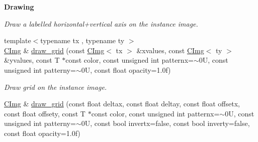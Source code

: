 \begin{Indent}{\bf Drawing}
\begin{DoxyCompactItemize}
\begin{DoxyCompactList}\small\item\em Draw a labelled horizontal+vertical axis on the instance image. \item\end{DoxyCompactList}\item 
\hypertarget{structcimg__library_1_1_c_img_a38f5283986f0cb4fdac660e489788634}{
{\footnotesize template$<$typename tx , typename ty $>$ }\\\hyperlink{structcimg__library_1_1_c_img}{CImg} \& \hyperlink{structcimg__library_1_1_c_img_a38f5283986f0cb4fdac660e489788634}{draw\_\-grid} (const \hyperlink{structcimg__library_1_1_c_img}{CImg}$<$ tx $>$ \&xvalues, const \hyperlink{structcimg__library_1_1_c_img}{CImg}$<$ ty $>$ \&yvalues, const T $\ast$const color, const unsigned int patternx=$\sim$0U, const unsigned int patterny=$\sim$0U, const float opacity=1.0f)}
\label{structcimg__library_1_1_c_img_a38f5283986f0cb4fdac660e489788634}

\begin{DoxyCompactList}\small\item\em Draw grid on the instance image. \item\end{DoxyCompactList}\item 
\hypertarget{structcimg__library_1_1_c_img_a30d5eea8b0712c1c33cba9540eb08938}{
\hyperlink{structcimg__library_1_1_c_img}{CImg} \& \hyperlink{structcimg__library_1_1_c_img_a30d5eea8b0712c1c33cba9540eb08938}{draw\_\-grid} (const float deltax, const float deltay, const float offsetx, const float offsety, const T $\ast$const color, const unsigned int patternx=$\sim$0U, const unsigned int patterny=$\sim$0U, const bool invertx=false, const bool inverty=false, const float opacity=1.0f)}
\label{structcimg__library_1_1_c_img_a30d5eea8b0712c1c33cba9540eb08938}


\end{DoxyCompactItemize}
\end{Indent}
